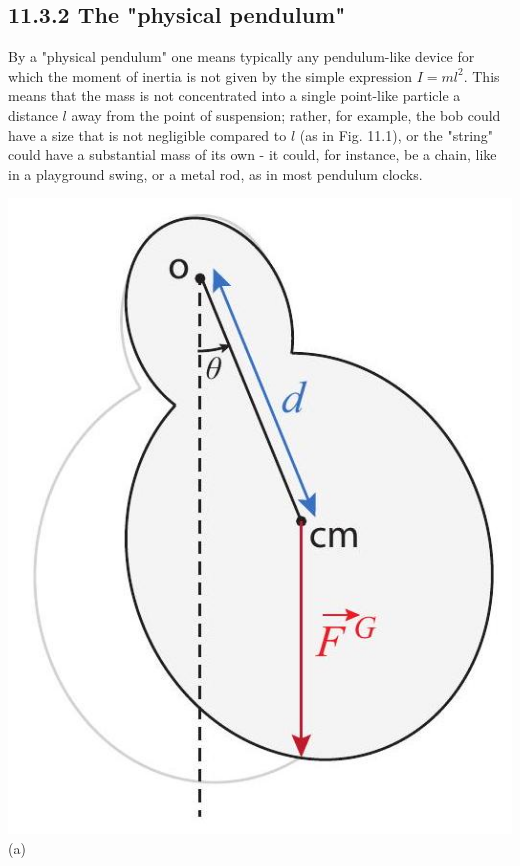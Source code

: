 \documentclass[10pt]{article}
\begin{document}
\subsection*{11.3.2 The "physical pendulum"}
By a "physical pendulum" one means typically any pendulum-like device for which the moment of inertia is not given by the simple expression $I=m l^{2}$. This means that the mass is not concentrated into a single point-like particle a distance $l$ away from the point of suspension; rather, for example, the bob could have a size that is not negligible compared to $l$ (as in Fig. 11.1), or the "string" could have a substantial mass of its own - it could, for instance, be a chain, like in a playground swing, or a metal rod, as in most pendulum clocks.

\includegraphics[max width=\textwidth, center]{2024_09_14_9969b06773f10b6936e8g-283(1)}\\
(a)
\end{document}

